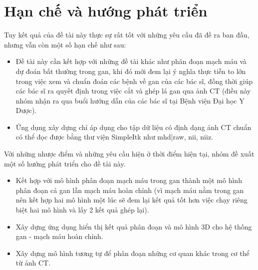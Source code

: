 \section{Hạn chế và hướng phát triển}
Tuy kết quả của đề tài này thực sự rất tốt với những yêu cầu đã đề ra ban đầu, nhưng vẫn còn một số hạn chế như sau:
\begin{itemize}
    \item Đề tài này cần kết hợp với những đề tài khác như phân đoạn mạch máu và dự đoán bất thường trong gan, khi đó mới đem lại ý nghĩa thực tiễn to lớn trong việc xem và chuẩn đoán các bệnh về gan của các bác sĩ, đồng thời giúp các bác sĩ ra quyết định trong việc cắt và ghép lá gan qua ảnh CT (điều này nhóm nhận ra qua buổi hướng dẫn của các bác sĩ tại Bệnh viện Đại học Y Dược).
    \item Ứng dụng xây dựng chỉ áp dụng cho tập dữ liệu có định dạng ảnh CT chuẩn có thể đọc được bằng thư viện SimpleItk như mhd|raw, nii, niiz.
\end{itemize}
Với những nhược điểm và những yêu cầu hiện ở thời điểm hiện tại, nhóm đề xuất một số hướng phát triển cho đề tài này.
\begin{itemize}
    \item Kết hợp với mô hình phân đoạn mạch máu trong gan thành một mô hình phân đoạn cả gan lẫn mạch máu hoàn chỉnh (vì mạch máu nằm trong gan nên kết hợp hai mô hình một lúc sẽ đem lại kết quả tốt hơn việc chạy riêng biệt hai mô hình và lấy 2 kết quả ghép lại).
    \item Xây dựng ứng dụng hiển thị kết quả phân đoạn và mô hình 3D cho hệ thống gan - mạch máu hoàn chỉnh.
    \item Xây dựng mô hình tương tự để phân đoạn những cơ quan khác trong cơ thể từ ảnh CT.
\end{itemize}



